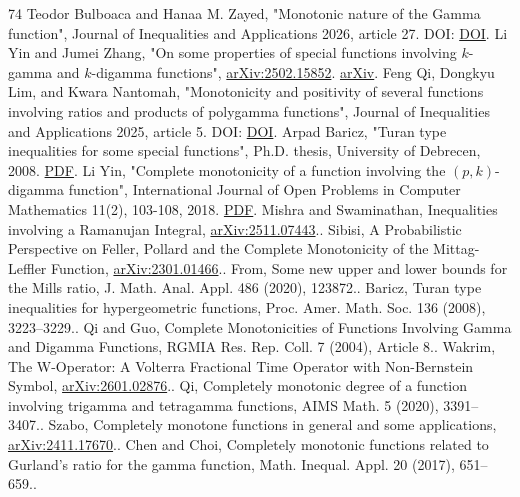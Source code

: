 \begin{thebibliography}{74}
 Teodor Bulboaca and Hanaa M. Zayed, "Monotonic nature of the Gamma function", Journal of Inequalities and Applications 2026, article 27. DOI: \href{https://doi.org/10.1186/s13660-025-03425-0}{DOI}.
 Li Yin and Jumei Zhang, "On some properties of special functions involving \(k\)-gamma and \(k\)-digamma functions", \href{https://arxiv.org/abs/2502.15852}{arXiv:2502.15852}. \href{https://arxiv.org/abs/2502.15852}{arXiv}.
 Feng Qi, Dongkyu Lim, and Kwara Nantomah, "Monotonicity and positivity of several functions involving ratios and products of polygamma functions", Journal of Inequalities and Applications 2025, article 5. DOI: \href{https://doi.org/10.1186/s13660-024-03245-8}{DOI}.
 Arpad Baricz, "Turan type inequalities for some special functions", Ph.D. thesis, University of Debrecen, 2008. \href{https://dea.lib.unideb.hu/bitstreams/bdd4469f-1b1e-4996-9b90-73f5e1a6b0e8/download}{PDF}.
 Li Yin, "Complete monotonicity of a function involving the \((p,k)\)-digamma function", International Journal of Open Problems in Computer Mathematics 11(2), 103-108, 2018. \href{https://www.ijopcm.org/Vol/2018/2.9.pdf}{PDF}.
 Mishra and Swaminathan, Inequalities involving a Ramanujan Integral, \href{https://arxiv.org/abs/2511.07443}{arXiv:2511.07443}..
 Sibisi, A Probabilistic Perspective on Feller, Pollard and the Complete Monotonicity of the Mittag-Leffler Function, \href{https://arxiv.org/abs/2301.01466}{arXiv:2301.01466}..
 From, Some new upper and lower bounds for the Mills ratio, J. Math. Anal. Appl. 486 (2020), 123872..
 Baricz, Turan type inequalities for hypergeometric functions, Proc. Amer. Math. Soc. 136 (2008), 3223--3229..
 Qi and Guo, Complete Monotonicities of Functions Involving Gamma and Digamma Functions, RGMIA Res. Rep. Coll. 7 (2004), Article 8..
 Wakrim, The W-Operator: A Volterra Fractional Time Operator with Non-Bernstein Symbol, \href{https://arxiv.org/abs/2601.02876}{arXiv:2601.02876}..
 Qi, Completely monotonic degree of a function involving trigamma and tetragamma functions, AIMS Math. 5 (2020), 3391--3407..
 Szabo, Completely monotone functions in general and some applications, \href{https://arxiv.org/abs/2411.17670}{arXiv:2411.17670}..
 Chen and Choi, Completely monotonic functions related to Gurland's ratio for the gamma function, Math. Inequal. Appl. 20 (2017), 651--659..

\end{thebibliography}
